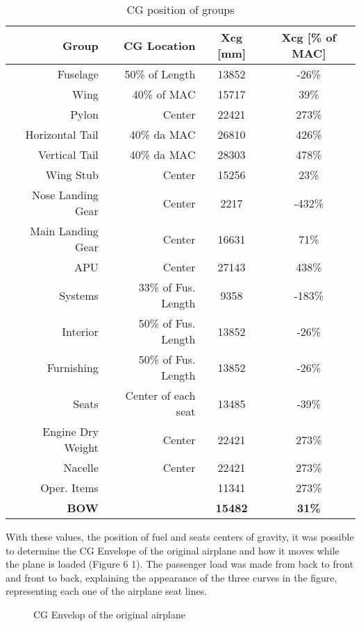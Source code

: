 \begin{table}[htbp]
  \centering
  \caption{CG position of groups}
    \begin{tabular}{rrcc}
    \toprule
    \textbf{ Group} & \textbf{CG Location} & \textbf{Xcg [mm]} & \textbf{Xcg [\% of MAC]} \\
    \midrule
    Fuselage & 50\% of Length & 13852 & -26\% \\
    Wing  & 40\% of MAC & 15717 & 39\% \\
    Pylon & Center & 22421 & 273\% \\
    Horizontal Tail & 40\% da MAC & 26810 & 426\% \\
    Vertical Tail & 40\% da MAC & 28303 & 478\% \\
    Wing Stub & Center & 15256 & 23\% \\
    Nose Landing Gear & Center & 2217  & -432\% \\
    Main Landing Gear & Center & 16631 & 71\% \\
    APU   & Center & 27143 & 438\% \\
    Systems & 33\% of Fus. Length & 9358  & -183\% \\
    Interior & 50\% of Fus. Length & 13852 & -26\% \\
    Furnishing & 50\% of Fus. Length & 13852 & -26\% \\
    Seats & Center of each seat & 13485 & -39\% \\
    Engine Dry Weight & Center & 22421 & 273\% \\
    Nacelle & Center & 22421 & 273\% \\
    Oper. Items &       & 11341 & 273\% \\
    \textbf{BOW} & \textbf{} & \textbf{15482} & \textbf{31\%} \\
    \bottomrule
    \end{tabular}%
  \label{tab:cgposition}%
\end{table}%



With these values, the position of fuel and seats centers of gravity, it was possible to determine the CG Envelope of the original airplane and how it moves while the plane is loaded (Figure 6 1). The passenger load was made from back to front and front to back, explaining the appearance of the three curves in the figure, representing each one of the airplane seat lines.


\begin{figure}[H] %
\caption{CG Envelop of the original airplane}
\label{fig:compressiblepolar}
\end{figure}


